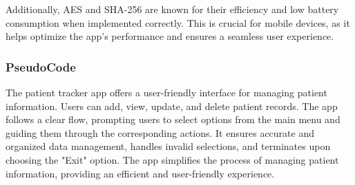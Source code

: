 \documentclass[12pt]{article}
\begin{document}
			Additionally, AES and SHA-256 are known for their efficiency and low battery consumption when implemented correctly. This is crucial for mobile devices, as it helps optimize the app's performance and ensures a seamless user experience.
			
			
			
			\subsubsection{PseudoCode}
			
			\quad The patient tracker app offers a user-friendly interface for managing patient information. Users can add, view, update, and delete patient records. The app follows a clear flow, prompting users to select options from the main menu and guiding them through the corresponding actions. It ensures accurate and organized data management, handles invalid selections, and terminates upon choosing the "Exit" option. The app simplifies the process of managing patient information, providing an efficient and user-friendly experience.
			
\end{document}
